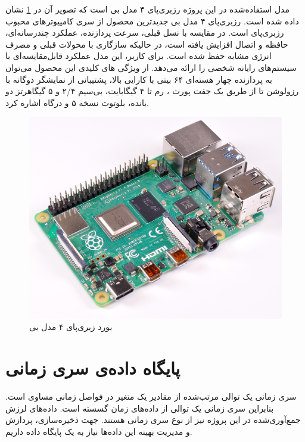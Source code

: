 مدل استفاده‌شده در این پروژه رزبری‌پای ۴ مدل بی است که تصویر آن در \cref{fig:raspberry_pi} نشان داده شده است. رزبری‌پای ۴ مدل بی جدیدترین محصول از سری کامپیوترهای محبوب رزبری‌پای است. در مقایسه با نسل قبلی، سرعت پردازنده، عملکرد چندرسانه‌ای، حافظه و اتصال افزایش یافته است، در حالیکه سازگاری با محولات قبلی و مصرف انرژی مشابه حفظ شده است. برای کاربر، این مدل عملکرد قابل‌مقایسه‌ای با سیستم‌های رایانه شخصی  را ارائه می‌دهد. از ویژگی های کلیدی این محصول می‌توان به پردازنده چهار هسته‌ای ۶۴ بیتی با کارایی بالا، پشتیبانی از نمایشگر دوگانه با رزولوشن تا  از طریق یک جفت پورت ، رم تا ۴ گیگابایت، بی‌سیم ۲/۴ و ۵ گیگاهرتز دو بانده، بلوتوث نسخه ۵ و درگاه  اشاره کرد\cite{raspberry}.

\begin{figure}[!h]
\centering\includegraphics[scale=.2]{raspberry_pi.png}
\caption{بورد زبری‌پای ۴ مدل بی}\label{fig:raspberry_pi}
\end{figure}


\section{پایگاه داده‌ی سری زمانی}

سری زمانی یک توالی مرتب‌شده از مقادیر یک متغیر در فواصل زمانی مساوی است. بنابراین سری زمانی یک توالی از داده‌های زمان گسسته است\cite{naqvi2017time}. داده‌های لرزش جمع‌آوری‌شده در این پروژه نیز از نوع سری زمانی هستند. جهت ذخیره‌سازی، پردازش و مدیریت بهینه این داده‌ها نیاز به یک پایگاه داده داریم.


